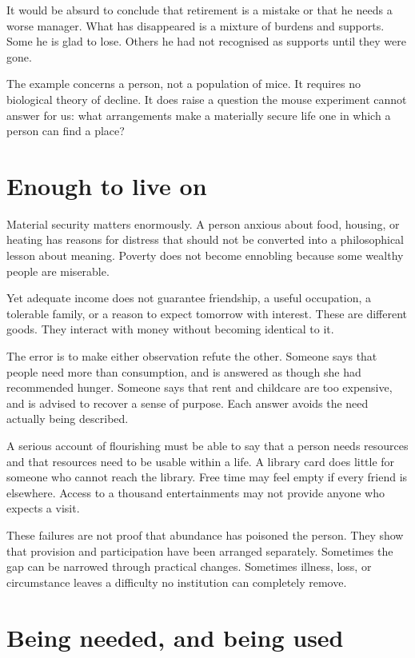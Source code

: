 \documentclass[12pt,a4paper]{book}
\begin{document}
It would be absurd to conclude that retirement is a mistake or that he needs a worse manager. What has disappeared is a mixture of burdens and supports. Some he is glad to lose. Others he had not recognised as supports until they were gone.

The example concerns a person, not a population of mice. It requires no biological theory of decline. It does raise a question the mouse experiment cannot answer for us: what arrangements make a materially secure life one in which a person can find a place?

\section*{Enough to live on}

Material security matters enormously. A person anxious about food, housing, or heating has reasons for distress that should not be converted into a philosophical lesson about meaning. Poverty does not become ennobling because some wealthy people are miserable.

Yet adequate income does not guarantee friendship, a useful occupation, a tolerable family, or a reason to expect tomorrow with interest. These are different goods. They interact with money without becoming identical to it.

The error is to make either observation refute the other. Someone says that people need more than consumption, and is answered as though she had recommended hunger. Someone says that rent and childcare are too expensive, and is advised to recover a sense of purpose. Each answer avoids the need actually being described.

A serious account of flourishing must be able to say that a person needs resources and that resources need to be usable within a life. A library card does little for someone who cannot reach the library. Free time may feel empty if every friend is elsewhere. Access to a thousand entertainments may not provide anyone who expects a visit.

These failures are not proof that abundance has poisoned the person. They show that provision and participation have been arranged separately. Sometimes the gap can be narrowed through practical changes. Sometimes illness, loss, or circumstance leaves a difficulty no institution can completely remove.

\section*{Being needed, and being used}
\end{document}
